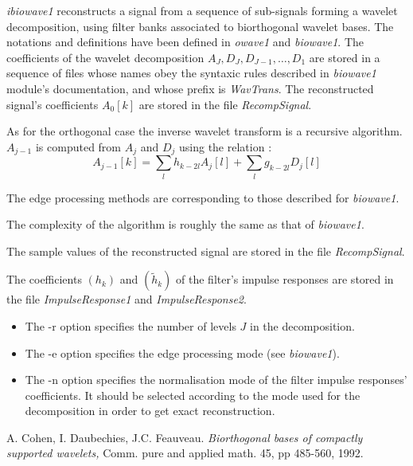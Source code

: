 {\em ibiowave1} reconstructs a signal from a sequence of sub-signals forming a wavelet decomposition, using filter banks associated to biorthogonal wavelet bases. The notations and definitions have been defined in {\em owave1} and {\em biowave1}. The coefficients of the wavelet decomposition \( A_{J}, D_{J}, D_{J-1}, \ldots, D_{1} \) are stored in a sequence of files whose names obey the syntaxic rules described in {\em biowave1} module's documentation, and whose prefix is {\em WavTrans}. The reconstructed signal's coefficients $A_{0}[k]$ are stored in the file {\em RecompSignal}.

As for the orthogonal case the inverse wavelet transform is a recursive algorithm.  \( A_{j-1} \) is computed from \( A_{j} \) and \( D_{j} \) using the relation :
\[
A_{j-1}[k] = \sum_{l} h_{k-2l} A_{j}[l] + \sum_{l} g_{k-2l} D_{j}[l]
\]

The edge processing methods are corresponding to those described for {\em biowave1}.

The complexity of the algorithm is roughly the same as that of {\em biowave1}.

The sample values of the reconstructed signal are stored in the file {\em RecompSignal}. 

The coefficients $(h_{k})$ and $(\tilde{h}_{k})$ of the filter's impulse responses are stored in the file {\em ImpulseResponse1} and {\em ImpulseResponse2}.

\begin{itemize}
\item
The -r option specifies the number of levels $J$ in the decomposition.
\item
The -e option specifies the edge processing mode (see {\em biowave1}).
\item
The -n option specifies the normalisation mode of the filter impulse responses' coefficients. It should be selected according to the mode used for the decomposition in order to get exact reconstruction. 
\end{itemize}


\begin{thebibliography}{CDF}

 A. Cohen, I. Daubechies, J.C. Feauveau. 
{\em Biorthogonal bases of compactly supported wavelets, } 
Comm. pure and applied math. 45, pp 485-560, 1992.

\end{thebibliography}

